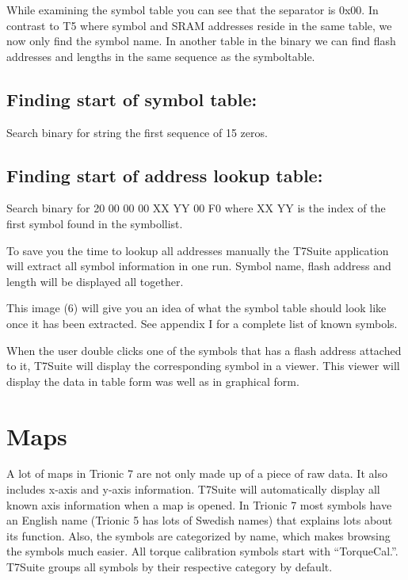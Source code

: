 \documentclass[11pt,a4paper]{book}
\begin{document}
While examining the symbol table you can see that the separator is 0x00. In contrast to T5 where
symbol and SRAM addresses reside in the same table, we now only find the symbol name. In another
table in the binary we can find flash addresses and lengths in the same sequence as the symboltable.

\section{Finding start of symbol table:}

Search binary for string the first sequence of 15 zeros.
\section{Finding start of address lookup table:}
Search binary for 20 00 00 00 XX YY 00 F0 where XX YY is the index of the first symbol found in the
symbollist.

To save you the time to lookup all addresses manually the T7Suite application will extract all symbol
information in one run. Symbol name, flash address and length will be displayed all together.

This image (6) will give you an idea of what the symbol table should look like once it has been
extracted. See appendix I for a complete list of known symbols.
\begin{figure}[<+htpb+>]
    \centering
    \missingfigure{}
    \caption{}
    \label{fig:}
\end{figure}

When the user double clicks one of the symbols that has a flash address attached to it, T7Suite will
display the corresponding symbol in a viewer. This viewer will display the data in table form was well
as in graphical form.
\begin{figure}[<+htpb+>]
    \centering
    \missingfigure{}
    \caption{}
    \label{fig:}
\end{figure}


\chapter{Maps}
A lot of maps in Trionic 7 are not only made up of a piece of raw data. It also
includes x-axis and y-axis information. T7Suite will automatically display all
known axis information when a map is opened. In Trionic 7 most symbols have an
English name (Trionic 5 has lots of Swedish names) that explains lots about its
function. Also, the symbols are categorized by name, which makes browsing the
symbols much easier. All torque calibration symbols start with
\enquote{TorqueCal.}.
T7Suite groups all symbols by their respective category by default.
\end{document}
